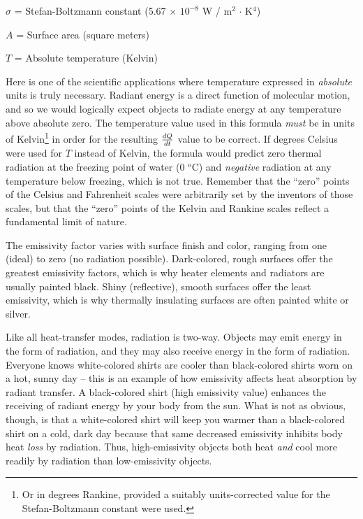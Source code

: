 $\sigma$ = Stefan-Boltzmann constant (5.67 $\times$ $10^{-8}$ W / m$^{2}$ $\cdot$ K$^{4}$)

$A$ = Surface area (square meters)

$T$ = Absolute temperature (Kelvin)

\vskip 10pt

Here is one of the scientific applications where temperature expressed in \textit{absolute} units is truly necessary.  Radiant energy is a direct function of molecular motion, and so we would logically expect objects to radiate energy at any temperature above absolute zero.  The temperature value used in this formula \textit{must} be in units of Kelvin\footnote{Or in degrees Rankine, provided a suitably units-corrected value for the Stefan-Boltzmann constant were used.} in order for the resulting $dQ \over dt$ value to be correct.  If degrees Celsius were used for $T$ instead of Kelvin, the formula would predict zero thermal radiation at the freezing point of water (0 $^{o}$C) and \textit{negative} radiation at any temperature below freezing, which is not true.  Remember that the ``zero'' points of the Celsius and Fahrenheit scales were arbitrarily set by the inventors of those scales, but that the ``zero'' points of the Kelvin and Rankine scales reflect a fundamental limit of nature.

The emissivity factor varies with surface finish and color, ranging from one (ideal) to zero (no radiation possible).  Dark-colored, rough surfaces offer the greatest emissivity factors, which is why heater elements and radiators are usually painted black.  Shiny (reflective), smooth surfaces offer the least emissivity, which is why thermally insulating surfaces are often painted white or silver.

\vskip 10pt

Like all heat-transfer modes, radiation is two-way.  Objects may emit energy in the form of radiation, and they may also receive energy in the form of radiation.  Everyone knows white-colored shirts are cooler than black-colored shirts worn on a hot, sunny day -- this is an example of how emissivity affects heat absorption by radiant transfer.  A black-colored shirt (high emissivity value) enhances the receiving of radiant energy by your body from the sun.  What is not as obvious, though, is that a white-colored shirt will keep you warmer than a black-colored shirt on a cold, dark day because that same decreased emissivity inhibits body heat \textit{loss} by radiation.  Thus, high-emissivity objects both heat \textit{and} cool more readily by radiation than low-emissivity objects.




